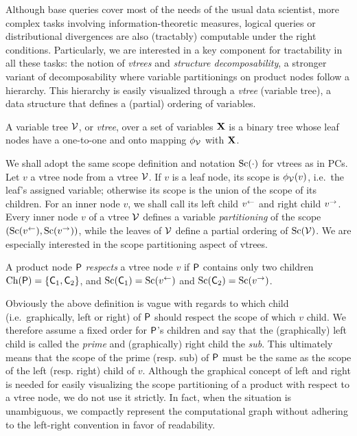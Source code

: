 Although base queries cover most of the needs of the usual data scientist, more complex tasks
involving information-theoretic measures, logical queries or distributional divergences are also
(tractably) computable under the right conditions. Particularly, we are interested in a key
component for tractability in all these tasks: the notion of \emph{vtrees} and \emph{structure
decomposability}, a stronger variant of decomposability where variable partitionings on product
nodes follow a hierarchy. This hierarchy is easily visualized through a \emph{vtree} (variable
tree), a data structure that defines a (partial) ordering of variables.

\begin{definition}[Vtree]
  A variable tree $\operatorname{\mathcal{V}}$, or \emph{vtree}, over a set of variables $\mathbf{X}$ is a binary tree
  whose leaf nodes have a one-to-one and onto mapping $\phi_{\operatorname{\mathcal{V}}}$ with $\mathbf{X}$.
\end{definition}

We shall adopt the same scope definition and notation $\operatorname*{\normalfont{Sc}}(\cdot)$ for vtrees as in PCs. Let $v$ a
vtree node from a vtree $\operatorname{\mathcal{V}}$. If $v$ is a leaf node, its scope is $\phi_{\operatorname{\mathcal{V}}}(v)$, i.e.\ the
leaf's assigned variable; otherwise its scope is the union of the scope of its children. For an
inner node $v$, we shall call its left child $v^\gets$ and right child $v^\to$. Every inner node
$v$ of a vtree $\operatorname{\mathcal{V}}$ defines a variable \emph{partitioning} of the scope $(\operatorname*{\normalfont{Sc}}(v^\gets),
\operatorname*{\normalfont{Sc}}(v^\to))$, while the leaves of $\operatorname{\mathcal{V}}$ define a partial ordering of $\operatorname*{\normalfont{Sc}}(\operatorname{\mathcal{V}})$. We are
especially interested in the scope partitioning aspect of vtrees.

\begin{definition}
  A product node $\operatorname{\textsf{P}}$ \emph{respects} a vtree node $v$ if $\operatorname{\textsf{P}}$ contains only two children
  $\operatorname*{\normalfont{Ch}}(\operatorname{\textsf{P}})=\{\operatorname{\textsf{C}}_1,\operatorname{\textsf{C}}_2\}$, and $\operatorname*{\normalfont{Sc}}(\operatorname{\textsf{C}}_1)=\operatorname*{\normalfont{Sc}}(v^\gets)$ and $\operatorname*{\normalfont{Sc}}(\operatorname{\textsf{C}}_2)=
  \operatorname*{\normalfont{Sc}}(v^\to)$.
\end{definition}

Obviously the above definition is vague with regards to which child (i.e.\ graphically, left or
right) of $\operatorname{\textsf{P}}$ should respect the scope of which $v$ child. We therefore assume a fixed order
for $\operatorname{\textsf{P}}$'s children and say that the (graphically) left child is called the \emph{prime} and
(graphically) right child the \emph{sub}. This ultimately means that the scope of the prime (resp.
sub) of $\operatorname{\textsf{P}}$ must be the same as the scope of the left (resp. right) child of $v$. Although the
graphical concept of left and right is needed for easily visualizing the scope partitioning of a
product with respect to a vtree node, we do not use it strictly. In fact, when the situation is
unambiguous, we compactly represent the computational graph without adhering to the left-right
convention in favor of readability.

